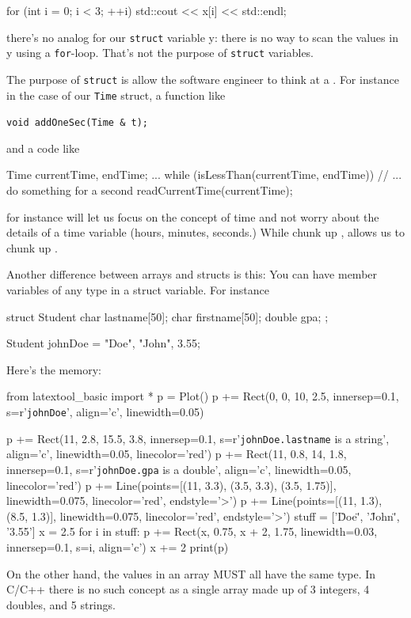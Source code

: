\begin{center}
\begin{center}
\begin{consolethree}[escapeinside=||]
for (int i = 0; i < 3; ++i)
{
    std::cout << x[i] << std::endl;
}
\end{consolethree}

there's no analog for our \texttt{struct} variable y:
there is no way to scan the values in y using a \texttt{for}-loop.
That's not the purpose of \texttt{struct} variables.

The purpose of \texttt{struct} is allow the software engineer to think at
a . For instance in the case of our
\texttt{Time} struct, a function like

\verb!void addOneSec(Time & t);!

and a code like

\begin{consolethree}[escapeinside=||]
Time currentTime, endTime;
...
while (isLessThan(currentTime, endTime))
{
    // ... do something for a second
    readCurrentTime(currentTime);
}
\end{consolethree}

for instance will let us focus on the concept of time and not worry
about the details of a time variable (hours, minutes, seconds.) While
 chunk up , 
allows us to chunk up .


Another difference between arrays and structs is this: You can have
member variables of any type in a struct variable. For instance

\begin{consolethree}[escapeinside=||]
struct Student
{
    char lastname[50];
    char firstname[50];
    double gpa;
};

Student johnDoe = {"Doe", "John", 3.55};
\end{consolethree}

Here's the memory:
\begin{python}
from latextool_basic import *
p = Plot()
p += Rect(0, 0, 10, 2.5, innersep=0.1, s=r'{\tt    johnDoe}', align='c', linewidth=0.05)

p += Rect(11, 2.8, 15.5, 3.8, innersep=0.1, s=r'{\tt johnDoe.lastname} is a string', align='c', linewidth=0.05, linecolor='red')
p += Rect(11, 0.8, 14, 1.8, innersep=0.1, s=r'{\tt johnDoe.gpa} is a double', align='c', linewidth=0.05, linecolor='red')
p += Line(points=[(11, 3.3), (3.5, 3.3), (3.5, 1.75)], linewidth=0.075, linecolor='red', endstyle='>')
p += Line(points=[(11, 1.3), (8.5, 1.3)], linewidth=0.075, linecolor='red', endstyle='>')
stuff = ['\"Doe\"', '\"John\"', '3.55']
x = 2.5
for i in stuff:
    p += Rect(x, 0.75, x + 2, 1.75, linewidth=0.03, innersep=0.1, s=i, align='c')
    x += 2
print(p)
\end{python}
On the other hand, the values in an array MUST all have the same type.
In C/C++ there is no such concept as a single array made up of 3
integers, 4 doubles, and 5 strings.


\end{center}
\end{center}
